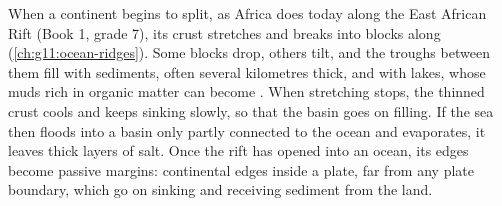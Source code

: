 When a continent begins to split, as Africa does today along the East
African Rift (Book 1, grade 7), its crust stretches and breaks into blocks
along  (\cref{ch:g11:ocean-ridges}). Some blocks drop, others
tilt, and the troughs between them fill with sediments, often several
kilometres thick, and with lakes, whose muds rich in organic matter can
become . When
stretching stops, the thinned crust cools and keeps sinking slowly, so that
the basin goes on filling. If the sea then floods into a basin only
partly connected to the ocean and evaporates, it leaves thick layers of
salt. Once the rift has opened into an ocean, its edges become passive
margins: continental edges inside a plate, far from any plate boundary, which
go on sinking and receiving sediment from the land.

